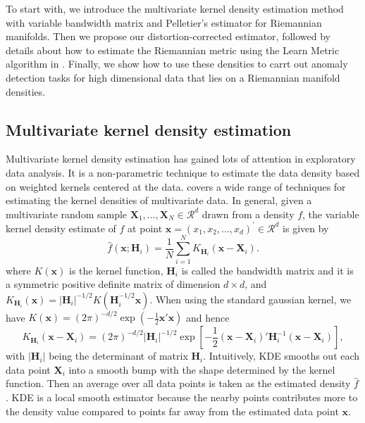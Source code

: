 \documentclass[11pt,a4paper,]{article}
\begin{document}
To start with, we introduce the multivariate kernel density estimation method with variable bandwidth matrix and Pelletier's estimator for Riemannian manifolds. Then we propose our distortion-corrected estimator, followed by details about how to estimate the Riemannian metric using the Learn Metric algorithm in \textcite{Perrault-Joncas2013-pq}. Finally, we show how to use these densities to carrt out anomaly detection tasks for high dimensional data that lies on a Riemannian manifold densities.

\hypertarget{mvkde}{%
\subsection{Multivariate kernel density estimation}\label{mvkde}}

Multivariate kernel density estimation has gained lots of attention in exploratory data analysis. It is a non-parametric technique to estimate the data density based on weighted kernels centered at the data. \textcite{Scott2015-vl} covers a wide range of techniques for estimating the kernel densities of multivariate data.
In general, given a multivariate random sample \(\pmb{X}_1, \dots, \pmb{X}_N \in \mathcal{R}^d\)
drawn from a density \(f\), the variable kernel density estimate \autocite{Breiman1977-qc,Jones1990-oe,Terrell1992-ut} of \(f\) at point \(\pmb{x}=(x_1, x_2, \dots, x_d)^\prime \in \mathcal{R}^d\) is given by
\begin{equation}
\label{eq:vkde}
\hat{f}(\pmb{x};\pmb{H}_i)=\frac{1}{N}\sum\limits_{i=1}^N K_{\pmb{H}_i}(\pmb{x}-\pmb{X}_i).
\end{equation}
where \(K(\pmb{x})\) is the kernel function, \(\pmb{H}_i\) is called the bandwidth matrix and it is a symmetric positive definite matrix of dimension \(d\times d\), and \(K_{\pmb{H}_i}(\pmb{x}) = |\pmb{H}_i|^{-1/2} K(\pmb{H}_i^{-1/2}\pmb{x})\).
When using the standard gaussian kernel, we have \(K(\pmb{x}) = (2\pi)^{-d/2}\exp(-\frac{1}{2}\pmb{x}'\pmb{x})\) and hence
\begin{equation}
\label{eq:kernel}
K_{\pmb{H}_i}(\pmb{x}-\pmb{X}_i)=(2\pi)^{-d/2}|\pmb{H}_i|^{-1/2}\exp\left[-\frac{1}{2}(\pmb{x}-\pmb{X}_i)'\pmb{H}_i^{-1}(\pmb{x}-\pmb{X}_i)\right],
\end{equation}
with \(|\pmb{H}_i|\) being the determinant of matrix \(\pmb{H}_i\).
Intuitively, KDE smooths out each data point \(\pmb{X}_i\) into a smooth bump with the shape determined by the kernel function. Then an average over all data points is taken as the estimated density \(\hat{f}\). KDE is a local smooth estimator because the nearby points contributes more to the density value compared to points far away from the estimated data point \(\pmb{x}\).
\end{document}
